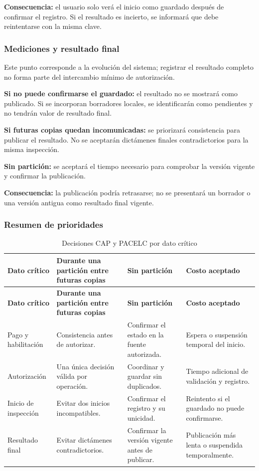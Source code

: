 \documentclass[11pt,a4paper]{article}
\begin{document}
	\textbf{Consecuencia:} el usuario solo verá el inicio como guardado después de confirmar el registro. Si el resultado es incierto, se informará que debe reintentarse con la misma clave.
	
	\subsubsection{Mediciones y resultado final}
	
	Este punto corresponde a la evolución del sistema; registrar el resultado completo no forma parte del intercambio mínimo de autorización.
	
	\textbf{Si no puede confirmarse el guardado:} el resultado no se mostrará como publicado. Si se incorporan borradores locales, se identificarán como pendientes y no tendrán valor de resultado final.
	
	\textbf{Si futuras copias quedan incomunicadas:} se priorizará consistencia para publicar el resultado. No se aceptarán dictámenes finales contradictorios para la misma inspección.
	
	\textbf{Sin partición:} se aceptará el tiempo necesario para comprobar la versión vigente y confirmar la publicación.
	
	\textbf{Consecuencia:} la publicación podría retrasarse; no se presentará un borrador o una versión antigua como resultado final vigente.
	
	\subsubsection{Resumen de prioridades}
	
	\begin{xltabular}{\textwidth}{L{2.9cm}XXX}
		\caption{Decisiones CAP y PACELC por dato crítico}\label{tab:cap}\\
		\toprule
		\textbf{Dato crítico} & \textbf{Durante una partición entre futuras copias} & \textbf{Sin partición} & \textbf{Costo aceptado} \\
		\midrule
		\endfirsthead
		\toprule
		\textbf{Dato crítico} & \textbf{Durante una partición entre futuras copias} & \textbf{Sin partición} & \textbf{Costo aceptado} \\
		\midrule
		\endhead
		\bottomrule
		\endfoot
		Pago y habilitación & Consistencia antes de autorizar. & Confirmar el estado en la fuente autorizada. & Espera o suspensión temporal del inicio. \\
		Autorización & Una única decisión válida por operación. & Coordinar y guardar sin duplicados. & Tiempo adicional de validación y registro. \\
		Inicio de inspección & Evitar dos inicios incompatibles. & Confirmar el registro y su unicidad. & Reintento si el guardado no puede confirmarse. \\
		Resultado final & Evitar dictámenes contradictorios. & Confirmar la versión vigente antes de publicar. & Publicación más lenta o suspendida temporalmente. \\
	\end{xltabular}
	
\end{document}
